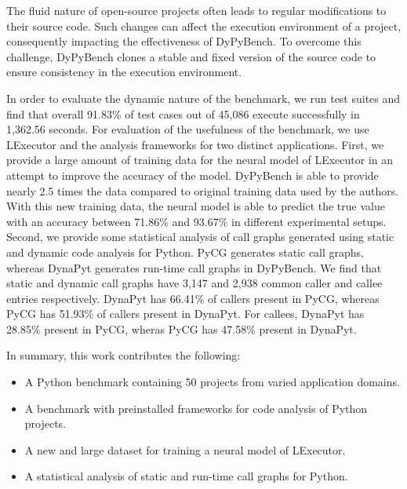 The fluid nature of open-source projects often leads to regular modifications to their source code.
Such changes can affect the execution environment of a project, consequently impacting the effectiveness of DyPyBench.
To overcome this challenge, DyPyBench clones a stable and fixed version of the source code to ensure consistency in the execution environment.

In order to evaluate the dynamic nature of the benchmark, we run test suites and find that overall 91.83\% of test cases out of 45,086 execute successfully in 1,362.56 seconds.
For evaluation of the usefulness of the benchmark, we use LExecutor and the analysis frameworks for two distinct applications.
First, we provide a large amount of training data for the neural model of LExecutor in an attempt to improve the accuracy of the model.
DyPyBench is able to provide nearly 2.5 times the data compared to original training data used by the authors.
With this new training data, the neural model is able to predict the true value with an accuracy between 71.86\% and 93.67\% in different experimental setups.
Second, we provide some statistical analysis of call graphs generated using static and dynamic code analysis for Python.
PyCG generates static call graphs, whereas DynaPyt generates run-time call graphs in DyPyBench.
We find that static and dynamic call graphs have 3,147 and 2,938 common caller and callee entries respectively.
DynaPyt has 66.41\% of callers present in PyCG, whereas PyCG has 51.93\% of callers present in DynaPyt.
For callees, DynaPyt has 28.85\% present in PyCG, wheras PyCG has 47.58\% present in DynaPyt.

In summary, this work contributes the following:
\begin{itemize}
    \item A Python benchmark containing 50 projects from varied application domains.
    \item A benchmark with preinstalled frameworks for code analysis of Python projects.
    \item A new and large dataset for training a neural model of LExecutor.
    \item A statistical analysis of static and run-time call graphs for Python.
\end{itemize}
